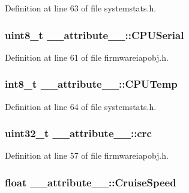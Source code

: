 \-Definition at line 63 of file systemstats.\-h.

\hypertarget{struct____attribute_____a09520bec9d958c9910ce76b01c7885b0}{
\subsubsection[{\-C\-P\-U\-Serial}]{\setlength{\rightskip}{0pt plus 5cm}uint8\-\_\-t {\bf \-\_\-\-\_\-attribute\-\_\-\-\_\-\-::\-C\-P\-U\-Serial}}}\label{struct____attribute_____a09520bec9d958c9910ce76b01c7885b0}


\-Definition at line 61 of file firmwareiapobj.\-h.

\hypertarget{struct____attribute_____aca4d07c062d4a97a08642fc45a3aeb4b}{
\subsubsection[{\-C\-P\-U\-Temp}]{\setlength{\rightskip}{0pt plus 5cm}int8\-\_\-t {\bf \-\_\-\-\_\-attribute\-\_\-\-\_\-\-::\-C\-P\-U\-Temp}}}\label{struct____attribute_____aca4d07c062d4a97a08642fc45a3aeb4b}


\-Definition at line 64 of file systemstats.\-h.

\hypertarget{struct____attribute_____a50e0d9114a2d620537f5cf9f71114be6}{
\subsubsection[{crc}]{\setlength{\rightskip}{0pt plus 5cm}uint32\-\_\-t {\bf \-\_\-\-\_\-attribute\-\_\-\-\_\-\-::crc}}}\label{struct____attribute_____a50e0d9114a2d620537f5cf9f71114be6}


\-Definition at line 57 of file firmwareiapobj.\-h.

\hypertarget{struct____attribute_____a0e4e264399d016c48cec091900137852}{
\subsubsection[{\-Cruise\-Speed}]{\setlength{\rightskip}{0pt plus 5cm}float {\bf \-\_\-\-\_\-attribute\-\_\-\-\_\-\-::\-Cruise\-Speed}}}\label{struct____attribute_____a0e4e264399d016c48cec091900137852}


